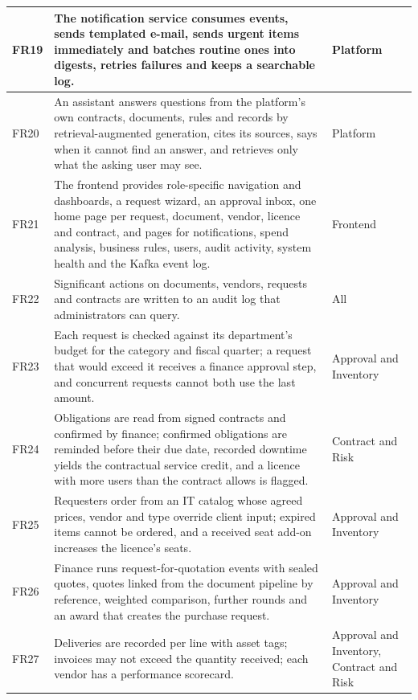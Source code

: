 {\begin{longtable}{|L{0.07\textwidth}|L{0.64\textwidth}|L{0.17\textwidth}|}
FR19 & The notification service consumes events, sends templated e-mail, sends urgent items immediately and batches routine ones into digests, retries failures and keeps a searchable log. & Platform \\ \hline
FR20 & An assistant answers questions from the platform's own contracts, documents, rules and records by retrieval-augmented generation, cites its sources, says when it cannot find an answer, and retrieves only what the asking user may see. & Platform \\ \hline
FR21 & The frontend provides role-specific navigation and dashboards, a request wizard, an approval inbox, one home page per request, document, vendor, licence and contract, and pages for notifications, spend analysis, business rules, users, audit activity, system health and the Kafka event log. & Frontend \\ \hline
FR22 & Significant actions on documents, vendors, requests and contracts are written to an audit log that administrators can query. & All \\ \hline
FR23 & Each request is checked against its department's budget for the category and fiscal quarter; a request that would exceed it receives a finance approval step, and concurrent requests cannot both use the last amount. & Approval and Inventory \\ \hline
FR24 & Obligations are read from signed contracts and confirmed by finance; confirmed obligations are reminded before their due date, recorded downtime yields the contractual service credit, and a licence with more users than the contract allows is flagged. & Contract and Risk \\ \hline
FR25 & Requesters order from an IT catalog whose agreed prices, vendor and type override client input; expired items cannot be ordered, and a received seat add-on increases the licence's seats. & Approval and Inventory \\ \hline
FR26 & Finance runs request-for-quotation events with sealed quotes, quotes linked from the document pipeline by reference, weighted comparison, further rounds and an award that creates the purchase request. & Approval and Inventory \\ \hline
FR27 & Deliveries are recorded per line with asset tags; invoices may not exceed the quantity received; each vendor has a performance scorecard. & Approval and Inventory, Contract and Risk \\ \hline
\end{longtable}}

